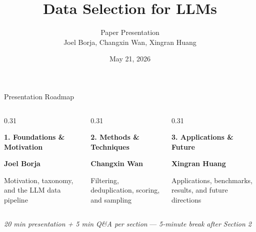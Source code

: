 \documentclass[aspectratio=169]{beamer}
\title{Data Selection for LLMs}
\author{Paper Presentation \\ Joel Borja, Changxin Wan, Xingran Huang}
\institute{EE 269, UC Riverside}
\date{May 21, 2026}
\begin{document}
\begin{frame}[plain]
  \titlepage
\end{frame}

\begin{frame}{Presentation Roadmap}

\vspace{1.5em}

\begin{columns}[T,totalwidth=\textwidth]

\begin{column}{0.31\textwidth}
\begin{minipage}[t][1.25cm][t]{\linewidth}
{\color{ucrblue}\large\textbf{1. Foundations \&\\ Motivation}}
\end{minipage}

\textbf{Joel Borja}

\vspace{0.8em}
Motivation, taxonomy, and the LLM data pipeline
\end{column}

\begin{column}{0.31\textwidth}
\begin{minipage}[t][1.25cm][t]{\linewidth}
{\color{ucrblue}\large\textbf{2. Methods \&\\ Techniques}}
\end{minipage}

\textbf{Changxin Wan}

\vspace{0.8em}
Filtering, deduplication, scoring, and sampling
\end{column}

\begin{column}{0.31\textwidth}
\begin{minipage}[t][1.25cm][t]{\linewidth}
{\color{ucrblue}\large\textbf{3. Applications \&\\ Future}}
\end{minipage}

\textbf{Xingran Huang}

\vspace{0.8em}
Applications, benchmarks, results, and future directions
\end{column}

\end{columns}

\vfill

\centering
\footnotesize
\textit{20 min presentation + 5 min Q\&A per section}
\quad --- \quad
\textit{5-minute break after Section 2}

\end{frame}
\end{document}
